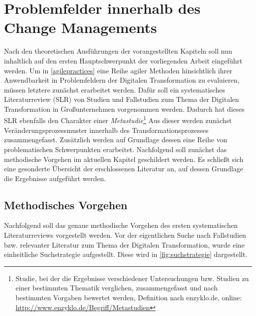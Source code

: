 \chapter{Problemfelder innerhalb des Change Managements}
\label{problemfields}


Nach den theoretischen Ausführungen der vorangestellten Kapiteln soll nun inhaltlich auf den ersten Hauptschwerpunkt der vorliegenden Arbeit eingeführt werden. Um in \ref{agilepractices} eine Reihe agiler Methoden hinsichtlich ihrer Anwendbarkeit in Problemfeldern der Digitalen Transformation zu evaluieren, müssen letztere zunächst erarbeitet werden. Dafür soll ein systematisches Literaturreview (\gls{SLR}) von Studien und Fallstudien zum Thema der Digitalen Transformation in Großunternehmen vorgenommen werden. Dadurch hat dieses SLR ebenfalls den Charakter einer \textit{Metastudie}\footnote{Studie, bei der die Ergebnisse verschiedener Untersuchungen bzw. Studien zu einer bestimmten Thematik verglichen, zusammengefasst und nach bestimmten Vorgaben bewertet werden, Definition nach enzyklo.de, online: \url{http://www.enzyklo.de/Begriff/Metastudien}} Aus dieser werden zunächst Veränderungsprozessmuster innerhalb des Transformationsprozesses  zusammengefasst.  Zusätzlich werden auf Grundlage dessen eine Reihe von problematischen Schwerpunkten erarbeitet. Nachfolgend soll zunächst das methodische Vorgehen im aktuellen Kapitel geschildert werden. Es schließt sich eine gesonderte Übersicht der erschlossenen Literatur an, auf dessen Grundlage  die Ergebnisse aufgeführt werden.  

\section{Methodisches Vorgehen}
\label{problemfields:methods}


Nachfolgend soll das genaue methodische Vorgehen des ersten systematischen Literaturreviews vorgestellt werden. Vor der eigentlichen Suche nach Fallstudien bzw. relevanter Literatur zum Thema der Digitalen Transformation, wurde eine einheitliche Suchstrategie aufgestellt. Diese wird in \ref{fig:suchstrategie} dargestellt. 

